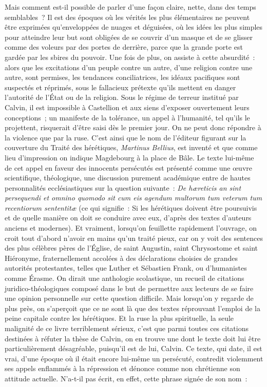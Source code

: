 \documentclass[french,twoside]{book} %
\newcommand\foreign[1]{\emph{#1}}
\begin{document}
Mais comment est-il possible de parler d’une façon claire, nette, dans des temps semblables ? Il est des époques où les vérités les plus élémentaires ne peuvent être exprimées qu’enveloppées de nuages et déguisées, où les idées les plus simples pour atteindre leur but sont obligées de se couvrir d’un masque et de se glisser comme des voleurs par des portes de derrière, parce que la grande porte est gardée par les sbires du pouvoir. Une fois de plus, on assiste à cette absurdité : alors que les excitations d’un peuple contre un autre, d’une religion contre une autre, sont permises, les tendances conciliatrices, les idéaux pacifiques sont suspectés et réprimés, sous le fallacieux prétexte qu’ils mettent en danger l’autorité de l’État ou de la religion. Sous le régime de terreur institué par Calvin, il est impossible à Castellion et aux siens d’exposer ouvertement leurs conceptions ; un manifeste de la tolérance, un appel à l’humanité, tel qu’ils le projettent, risquerait d’être saisi dès le premier jour. On ne peut donc répondre à la violence que par la ruse. C’est ainsi que le nom de l’éditeur figurant sur la couverture du Traité des hérétiques, \emph{Martinus Bellius}, est inventé et que comme lieu d’impression on indique Magdebourg à la place de Bâle. Le texte lui-même de cet appel en faveur des innocents persécutés est présenté comme une œuvre scientifique, théologique, une discussion purement académique entre de hautes personnalités ecclésiastiques sur la question suivante : \foreign{De hæreticis an sint persequendi et omnino quomodo sit cum eis agendum multorum tum veterum tum recentiorum sententitæ} (ce qui signifie : Si les hérétiques doivent être poursuivis et de quelle manière on doit se conduire avec eux, d’après des textes d’auteurs anciens et modernes). Et vraiment, lorsqu’on feuillette rapidement l’ouvrage, on croit tout d’abord n’avoir en mains qu’un traité pieux, car on y voit des sentences des plus célèbres pères de l’Église, de saint Augustin, saint Chrysostome et saint Hiéronyme, fraternellement accolées à des déclarations choisies de grandes autorités protestantes, telles que Luther et Sébastien Frank, ou d’humanistes comme Érasme. On dirait une anthologie scolastique, un recueil de citations juridico-théologiques composé dans le but de permettre aux lecteurs de se faire une opinion personnelle sur cette question difficile. Mais lorsqu’on y regarde de plus près, on s’aperçoit que ce ne sont là que des textes réprouvant l’emploi de la peine capitale contre les hérétiques. Et la ruse la plus spirituelle, la seule malignité de ce livre terriblement sérieux, c’est que parmi toutes ces citations destinées à réfuter la thèse de Calvin, on en trouve une dont le texte doit lui être particulièrement désagréable, puisqu’il est de lui, Calvin. Ce texte, qui date, il est vrai, d’une époque où il était encore lui-même un persécuté, contredit violemment ses appels enflammés à la répression et dénonce comme non chrétienne son attitude actuelle. N’a-t-il pas écrit, en effet, cette phrase signée de son nom :\par
\end{document}
